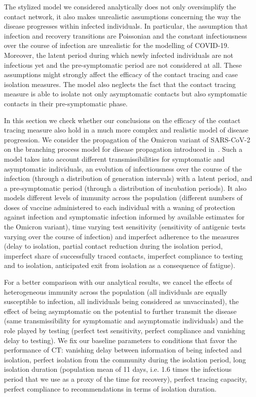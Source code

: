 \documentclass[aps,twocolumn,superscriptaddress,nofootinbib,pre,floatfix]{revtex4-1}
\begin{document}
The stylized model we considered analytically does not only
oversimplify the contact network, it also makes unrealistic
assumptions concerning the way the disease progresses within infected
individuals. In particular, the assumption that infection and recovery
transitions are Poissonian and the constant infectiousness over the
course of infection are unrealistic for the modelling of COVID-19. Moreover,
the latent period during which newly infected individuals are not
infectious yet and the pre-symptomatic period are not considered at
all.  These assumptions might strongly affect the efficacy of the
contact tracing and case isolation measures.  The model also neglects
the fact that the contact tracing measure is able to isolate not only
asymptomatic contacts but also symptomatic contacts in their
pre-symptomatic phase.

In this section we check whether our conclusions on the efficacy of
the contact tracing measure also hold in a much more complex and
realistic model of disease progression.
We consider the propagation of the Omicron variant of SARS-CoV-2 on
the branching process model for disease propagation introduced in~\cite{lancet}.
Such a model takes into account
different transmissibilities for symptomatic and asymptomatic
individuals, an evolution of infectiousness over the course of the
infection (through a distribution of generation
intervals) with a latent period, and a pre-symptomatic period (through a distribution of
incubation periods). It also models different levels of immunity
across the population (different numbers of doses of vaccine
administered to each individual with a waning of protection against
infection and symptomatic infection informed by available estimates
for the Omicron variant), time varying test sensitivity (sensitivity of antigenic
tests varying over the course of infection) and imperfect adherence to the
measures (delay to isolation, partial contact reduction during the
isolation period, imperfect share of successfully traced contacts,
imperfect compliance to testing and to isolation, anticipated exit
from isolation as a consequence of fatigue).

For a better comparison with our analytical results, we cancel the
effects of heterogeneous immunity across the population (all
individuals are equally susceptible to infection, all individuals
being considered as unvaccinated), the effect of being asymptomatic on
the potential to further transmit the disease (same transmissibility
for symptomatic and asymptomatic individuals) and the role played by
testing (perfect test sensitivity, perfect compliance and vanishing
delay to testing).  We fix our baseline parameters to conditions that
favor the performance of CT: vanishing delay between information of
being infected and isolation, perfect isolation from the community
during the isolation period, long isolation duration (population mean
of 11 days, i.e. 1.6 times the infectious period that we use as a
proxy of the time for recovery), perfect tracing capacity, perfect
compliance to recommendations in terms of isolation duration.
\end{document}
